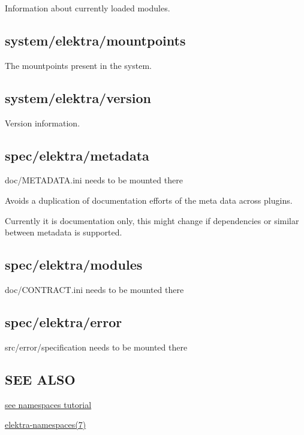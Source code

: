 Information about currently loaded modules.

\subsection*{system/elektra/mountpoints}

The mountpoints present in the system.

\subsection*{system/elektra/version}

Version information.

\subsection*{spec/elektra/metadata}

{\ttfamily doc/\+M\+E\+T\+A\+D\+A\+T\+A.\+ini} needs to be mounted there

Avoids a duplication of documentation efforts of the meta data across plugins.

Currently it is documentation only, this might change if dependencies or similar between metadata is supported.

\subsection*{spec/elektra/modules}

{\ttfamily doc/\+C\+O\+N\+T\+R\+A\+C\+T.\+ini} needs to be mounted there

\subsection*{spec/elektra/error}

{\ttfamily src/error/specification} needs to be mounted there

\subsection*{S\+E\+E A\+L\+S\+O}


\begin{DoxyItemize}
\item \hyperlink{doc_tutorials_namespaces_md}{see namespaces tutorial}
\item \hyperlink{md_doc_help_elektra-namespaces_doc_help_elektra-namespaces_md}{elektra-\/namespaces(7)} 
\end{DoxyItemize}